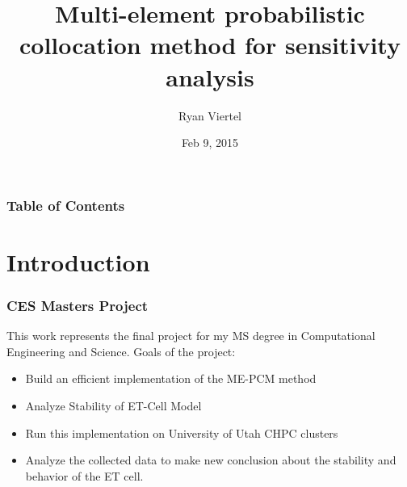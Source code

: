 \documentclass{beamer}
\title{Multi-element probabilistic collocation method for sensitivity analysis}
\author{Ryan Viertel}
\institute{University of Utah}
\date{Feb 9, 2015}
\theoremstyle{plain}
\theoremstyle{definition}
\begin{document}
\begin{frame}
\titlepage
\end{frame}

\begin{frame}
\frametitle{Table of Contents}
\tableofcontents
\end{frame}


\section{Introduction}

\begin{frame}\frametitle{CES Masters Project}
  This work represents the final project for my MS degree in Computational Engineering and Science.
\newline
\newline
  Goals of the project:
  \begin{itemize}
    \item Build an efficient implementation of the ME-PCM method%
    \item Analyze Stability of ET-Cell Model
    \item Run this implementation on University of Utah CHPC clusters%
    \item Analyze the collected data to make new conclusion about the stability and behavior of the ET cell.
  \end{itemize}
\end{frame}
\end{document}
